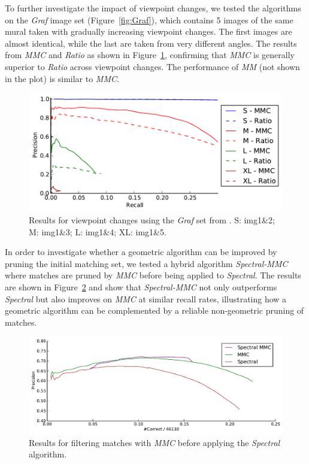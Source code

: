 To further investigate the impact of viewpoint changes, we tested the 
algorithms on the \emph{Graf} image set (Figure~\ref{fig:Graf}), which 
contains 5 images of the same mural taken with gradually increasing 
viewpoint changes.  The first images are almost identical, while the 
last are taken from very different angles. The results from   \emph{MMC} 
and \emph{Ratio} as shown in Figure~\ref{fig:result_viewpoint}, 
confirming that \emph{MMC} is generally superior to \emph{Ratio} across 
viewpoint changes.
The performance of \emph{MM} (not shown in the plot) is similar to 
\emph{MMC}.

\begin{figure}[htb]
	\centering
	\includegraphics[width=1\textwidth]{images/result_viewpoint}
	\caption{Results for viewpoint changes using the \emph{Graf} set 
	from \cite{mikolajczyk2005performance}.  S: img1\&2; M: img1\&3; L: 
	img1\&4; XL: img1\&5.}
	\label{fig:result_viewpoint}
\end{figure}

In order to investigate whether a geometric algorithm can be improved by
pruning the initial matching set, we tested a hybrid algorithm 
\emph{Spectral-MMC} where matches are pruned by \emph{MMC} before being 
applied to \emph{Spectral}. The results are shown in 
Figure~\ref{fig:result_spectral-mmc} and show that \emph{Spectral-MMC} 
not only outperforms \emph{Spectral} but also improves on \emph{MMC} at 
similar recall rates, illustrating how a geometric algorithm can be 
complemented by a reliable non-geometric pruning of matches.
\begin{figure}[htb]
	\centering
	\includegraphics[width=1\textwidth]{images/result_spectral-mmc}
	\caption{Results for filtering matches with \emph{MMC} before 
	applying the \emph{Spectral} algorithm.}
	\label{fig:result_spectral-mmc}
\end{figure}

